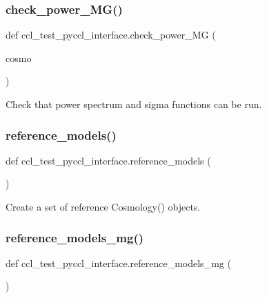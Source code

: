 \subsubsection{\texorpdfstring{check\+\_\+power\+\_\+\+M\+G()}{check\_power\_MG()}}
{\footnotesize\ttfamily def ccl\+\_\+test\+\_\+pyccl\+\_\+interface.\+check\+\_\+power\+\_\+\+MG (\begin{DoxyParamCaption}\item[{}]{cosmo }\end{DoxyParamCaption})}

\begin{DoxyVerb}Check that power spectrum and sigma functions can be run.
\end{DoxyVerb}
 \mbox{\label{namespaceccl__test__pyccl__interface_af12cc81b73f2b986dbddf49f0b57759a}} 
\subsubsection{\texorpdfstring{reference\+\_\+models()}{reference\_models()}}
{\footnotesize\ttfamily def ccl\+\_\+test\+\_\+pyccl\+\_\+interface.\+reference\+\_\+models (\begin{DoxyParamCaption}{ }\end{DoxyParamCaption})}

\begin{DoxyVerb}Create a set of reference Cosmology() objects.
\end{DoxyVerb}
 \mbox{\label{namespaceccl__test__pyccl__interface_a0fa0a0827887914d36a7e277eb03589d}} 
\subsubsection{\texorpdfstring{reference\+\_\+models\+\_\+mg()}{reference\_models\_mg()}}
{\footnotesize\ttfamily def ccl\+\_\+test\+\_\+pyccl\+\_\+interface.\+reference\+\_\+models\+\_\+mg (\begin{DoxyParamCaption}{ }\end{DoxyParamCaption})}

